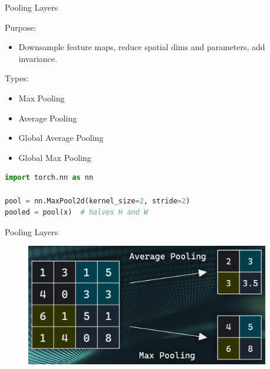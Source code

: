 \begin{frame}[fragile]{Pooling Layers}
\begin{block}{Purpose:}
    \begin{itemize}
        \item Downsample feature maps, reduce spatial dims and parameters, add invariance.
    \end{itemize}
\end{block}

\begin{block}{Types:}
    \begin{itemize}
        \item Max Pooling
        \item Average Pooling
        \item Global Average Pooling
        \item Global Max Pooling
    \end{itemize}
\end{block}

\begin{lstlisting}[language=Python, caption={Code snippet (PyTorch)}, basicstyle=\ttfamily\footnotesize]
import torch.nn as nn

pool = nn.MaxPool2d(kernel_size=2, stride=2)
pooled = pool(x)  # halves H and W
\end{lstlisting}
\end{frame}  

\begin{frame}[allowframebreaks]{Pooling Layers}
    \begin{figure}
    \centering
    \includegraphics[width=0.95\textwidth,height=0.95\textheight,keepaspectratio]{images/cnn/pooling-layer.png}
    \end{figure}
\end{frame}

